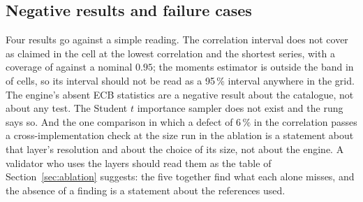 \subsection{Negative results and failure cases}

Four results go against a simple reading. The correlation interval does not cover as claimed in the cell at the lowest correlation and the shortest series, with a coverage of \gridMlWorstCov{} against a nominal $0.95$; the moments estimator is outside the band in \gridMomFail{} of \gridMomCells{} cells, so its interval should not be read as a 95\,\% interval anywhere in the grid. The engine's absent ECB statistics are a negative result about the catalogue, not about any test. The Student $t$ importance sampler does not exist and the rung says so. And the one comparison in which a defect of $6\,\%$ in the correlation passes a cross-implementation check at the size run in the ablation is a statement about that layer's resolution and about the choice of its size, not about the engine. A validator who uses the layers should read them as the table of Section~\ref{sec:ablation} suggests: the five together find what each alone misses, and the absence of a finding is a statement about the references used.

